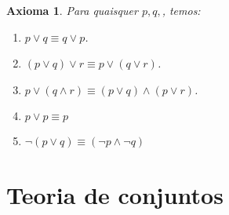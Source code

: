 \documentclass{article}
\newtheorem{axioma}{Axioma}
\theoremstyle{theorem}
\theoremstyle{lemma}
\theoremstyle{definition}
\theoremstyle{remark}
\begin{document}
\begin{axioma}
	Para quaisquer $p,q,$, temos:
	\begin{enumerate}
		\item $p \lor q \equiv q\lor p$.
		\item $(p \lor q) \lor r \equiv p \lor (q\lor r)$.
		\item $p\lor (q \land r)  \equiv (p\lor q) \land (p\lor r)$.
		\item $p\lor p \equiv p$
		\item $\neg (p\lor q)  \equiv (\neg p \land \neg q)$
	\end{enumerate}
\end{axioma}
\section{Teoria de conjuntos}
\end{document}

